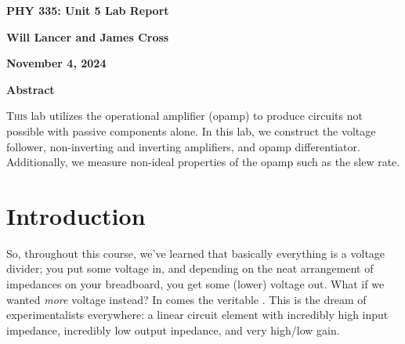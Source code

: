 \documentclass[11pt]{article}
\begin{document}
	\begin{center}
	{\huge \textbf{PHY 335: Unit 5 Lab Report}}

	\vspace{5pt}

	{\textbf{Will Lancer and James Cross}}

	\vspace{5pt}

	{\textbf{November 4, 2024}}
	\vspace{5pt}

	{\Large \textbf{Abstract}}
	\end{center}
	\begin{raggedleft}
	\lettrine{T}{his} lab utilizes the operational amplifier (opamp) to produce 
	circuits not possible with passive components alone. In this lab, we 
	construct the voltage follower, non-inverting and inverting amplifiers, and 
	opamp differentiator. Additionally, we measure non-ideal properties of the
	opamp such as the slew rate.
	\end{raggedleft}

\newpage

\section{Introduction}

So, throughout this course, we've learned that basically
everything is a voltage divider; you put some voltage in,
and depending on the neat arrangement of impedances on your
breadboard, you get some (lower) voltage out. What if we
wanted \emph{more} voltage instead? In comes the veritable
. This is the dream of experimentalists everywhere:
a linear circuit element with incredibly high input impedance,
incredibly low output inpedance, and very high/low gain.
\end{document}
